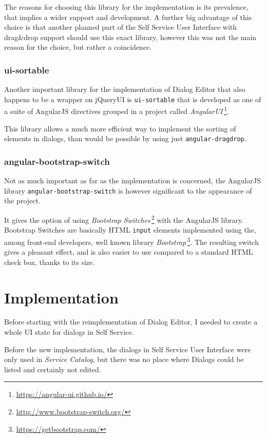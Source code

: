 The reasons for choosing this library for the implementation is its
prevalence, that implies a wider support and development.
A further big advantage of this choice is that another planned part of the
Self Service User Interface with drag\&drop support should use this exact
library, however this was not the main reason for the choice, but rather a
coincidence.

\subsection{ui-sortable}

Another important library for the implementation of Dialog Editor that also
happens to be a wrapper on jQueryUI is {\tt ui-sortable} that is developed as
one of a suite of AngularJS directives grouped in a project called
{\it AngularUI}\,\footnote{\url{https://angular-ui.github.io/}}.

This library allows a much more efficient way to implement the sorting of
elements in dialogs, than would be possible by using
just {\tt angular-dragdrop}.

\subsection{angular-bootstrap-switch}

Not as much important as far as the implementation is concerned, the AngularJS
library {\tt angular-bootstrap-switch} is however significant to the
appearance of the project.

It gives the option of using
{\it Bootstrap Switches}\,\footnote{\url{http://www.bootstrap-switch.org/}} with
the AngularJS library.
Bootstrap Switches are basically HTML {\tt input} elements implemented using
the, among front-end developers, well known library
{\it Bootstrap}\,\footnote{\url{https://getbootstrap.com/}}.
The resulting switch gives a pleasant effect, and is also easier to use
compared to a standard HTML check box, thanks to its size.

\chapter{Implementation}\label{ch:implementation}

Before starting with the reimplementation of Dialog Editor, I needed to
create a whole UI state for dialogs in Self Service.

Before the new implementation, the dialogs in Self Service User Interface were
only used in {\it Service Catalog}, but there was no place where Dialogs could
be listed and certainly not edited.

